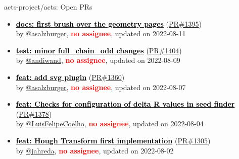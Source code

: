 \begin{frame}[allowframebreaks]{ acts-project/acts: Open PRs
}

  \begin{itemize}
    
    
    \item\propen
    \hspace*{0.1em}
    \textbf{\href{https://github.com/acts-project/acts/pull/1395}{\textcolor{black}{docs: first brush over the geometry pages}}}
    (\href{https://github.com/acts-project/acts/pull/1395}{PR\#1395}) \\
    by \href{https://github.com/asalzburger}{@asalzburger}, {}\textbf{\textcolor{Red}{no assignee}}, updated on 2022-08-11

    \item\propen
    \hspace*{0.1em}
    \textbf{\href{https://github.com/acts-project/acts/pull/1404}{\textcolor{black}{test: minor full\_chain\_odd changes}}}
    (\href{https://github.com/acts-project/acts/pull/1404}{PR\#1404}) \\
    by \href{https://github.com/andiwand}{@andiwand}, {}\textbf{\textcolor{Red}{no assignee}}, updated on 2022-08-09

    \item\propen
    \hspace*{0.1em}
    \textbf{\href{https://github.com/acts-project/acts/pull/1360}{\textcolor{black}{feat: add svg plugin}}}
    (\href{https://github.com/acts-project/acts/pull/1360}{PR\#1360}) \\
    by \href{https://github.com/asalzburger}{@asalzburger}, {}\textbf{\textcolor{Red}{no assignee}}, updated on 2022-08-07

    \item\propen
    \hspace*{0.1em}
    \textbf{\href{https://github.com/acts-project/acts/pull/1378}{\textcolor{black}{feat: Checks for configuration of delta R values in seed finder}}}
    (\href{https://github.com/acts-project/acts/pull/1378}{PR\#1378}) \\
    by \href{https://github.com/LuisFelipeCoelho}{@LuisFelipeCoelho}, {}\textbf{\textcolor{Red}{no assignee}}, updated on 2022-08-04

    \item\propen
    \hspace*{0.1em}
    \textbf{\href{https://github.com/acts-project/acts/pull/1305}{\textcolor{black}{feat: Hough Transform first implementation}}}
    (\href{https://github.com/acts-project/acts/pull/1305}{PR\#1305}) \\
    by \href{https://github.com/jahreda}{@jahreda}, {}\textbf{\textcolor{Red}{no assignee}}, updated on 2022-08-02

    
  \end{itemize}

\end{frame}







